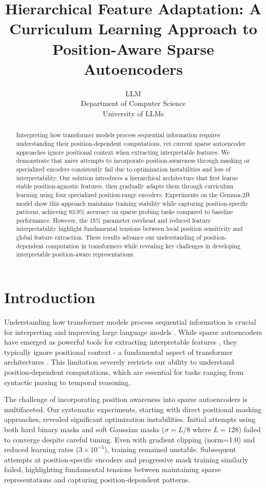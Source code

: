 \documentclass{article} %
\title{Hierarchical Feature Adaptation: A Curriculum Learning Approach to Position-Aware Sparse Autoencoders}
\author{LLM\\
Department of Computer Science\\
University of LLMs\\
}
\begin{document}
\maketitle

\begin{abstract}
Interpreting how transformer models process sequential information requires understanding their position-dependent computations, yet current sparse autoencoder approaches ignore positional context when extracting interpretable features. We demonstrate that naive attempts to incorporate position-awareness through masking or specialized encoders consistently fail due to optimization instabilities and loss of interpretability. Our solution introduces a hierarchical architecture that first learns stable position-agnostic features, then gradually adapts them through curriculum learning using four specialized position-range encoders. Experiments on the Gemma-2B model show this approach maintains training stability while capturing position-specific patterns, achieving 93.9\% accuracy on sparse probing tasks compared to baseline performance. However, the 15\% parameter overhead and reduced feature interpretability highlight fundamental tensions between local position sensitivity and global feature extraction. These results advance our understanding of position-dependent computation in transformers while revealing key challenges in developing interpretable position-aware representations.
\end{abstract}

\section{Introduction}
\label{sec:intro}

Understanding how transformer models process sequential information is crucial for interpreting and improving large language models \cite{gpt4}. While sparse autoencoders have emerged as powerful tools for extracting interpretable features \cite{goodfellow2016deep}, they typically ignore positional context - a fundamental aspect of transformer architectures \cite{vaswani2017attention}. This limitation severely restricts our ability to understand position-dependent computations, which are essential for tasks ranging from syntactic parsing to temporal reasoning.

The challenge of incorporating position awareness into sparse autoencoders is multifaceted. Our systematic experiments, starting with direct positional masking approaches, revealed significant optimization instabilities. Initial attempts using both hard binary masks and soft Gaussian masks ($\sigma = L/8$ where $L=128$) failed to converge despite careful tuning. Even with gradient clipping (norm=1.0) and reduced learning rates ($3\times10^{-5}$), training remained unstable. Subsequent attempts at position-specific encoders and progressive mask training similarly failed, highlighting fundamental tensions between maintaining sparse representations and capturing position-dependent patterns.
\end{document}
